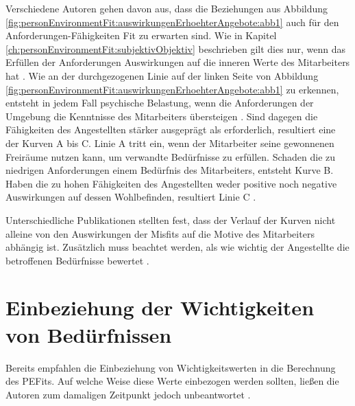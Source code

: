 Verschiedene Autoren gehen davon aus, dass die Beziehungen aus Abbildung \ref{fig:personEnvironmentFit:auswirkungenErhoehterAngebote:abb1} auch für den Anforderungen-Fähigkeiten Fit zu erwarten sind. Wie in Kapitel \ref{ch:personEnvironmentFit:subjektivObjektiv} beschrieben gilt dies nur, wenn das Erfüllen der Anforderungen Auswirkungen auf die inneren Werte des Mitarbeiters hat \cite[S. 12f.]{harrison:1978}. Wie an der durchgezogenen Linie auf der linken Seite von Abbildung \ref{fig:personEnvironmentFit:auswirkungenErhoehterAngebote:abb1} zu erkennen, entsteht in jedem Fall psychische Belastung, wenn die Anforderungen der Umgebung die Kenntnisse des Mitarbeiters übersteigen \cite[S. 5]{schuler:1980}. Sind dagegen die Fähigkeiten des Angestellten stärker ausgeprägt als erforderlich, resultiert eine der Kurven A bis C. Linie A tritt ein, wenn der Mitarbeiter seine gewonnenen Freiräume nutzen kann, um verwandte Bedürfnisse zu erfüllen. Schaden die zu niedrigen Anforderungen einem Bedürfnis des Mitarbeiters, entsteht Kurve B. Haben die zu hohen Fähigkeiten des Angestellten weder positive noch negative Auswirkungen auf dessen Wohlbefinden, resultiert Linie C \cite[S. 22f.]{edwards:2008}.

Unterschiedliche Publikationen stellten fest, dass der Verlauf der Kurven nicht alleine von den Auswirkungen der Misfits auf die Motive des Mitarbeiters abhängig ist. Zusätzlich muss beachtet werden, als wie wichtig der Angestellte die betroffenen Bedürfnisse bewertet \cite[S. 9f.]{edwards:1996}. 

\section{Einbeziehung der Wichtigkeiten von Bedürfnissen}
\label{ch:personEnvironmentFit:wichtigkeiten}
Bereits  \textcite[S. 7]{copingAndAdaption:1974} empfahlen die Einbeziehung von Wichtigkeitswerten in die Berechnung des \acp{PEFit}. Auf welche Weise diese Werte einbezogen werden sollten, ließen die Autoren zum damaligen Zeitpunkt jedoch unbeantwortet \cite[S. 19]{edwards:2008}.

